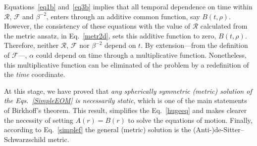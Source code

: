 Equations~\eqref{eq1b} and~\eqref{eq3b} implies that all temporal dependence on time within $\mathcal{R}$, $\mathcal{F}$ and $\beta^{-2}$, enters through an additive common function, say $B(t,\rho)$. However, the consistency of these equations with the value of $\mathcal{R}$ calculated from the metric ansatz, in Eq.~\eqref{metr2d}, sets this additive function to zero, $B(t,\rho)$. Therefore, neither $\mathcal{R}$, $\mathcal{F}$ nor $\beta^{-2}$ depend on $t$. By extension---from the definition of $\mathcal{F}$---, $\alpha$ could depend on time through a multiplicative function. Nonetheless, this multiplicative function can be eliminated of the problem by a redefinition of the \emph{time} coordinate.

At this stage, we have proved that \emph{any spherically symmetric (metric) solution of the Eqs.~\eqref{SimpleEOM} is necessarily static}, which is one of the main statements of Birkhoff's theorem. This result, simplifies the Eq.~\eqref{hugeeq} and makes clearer the necessity of setting $A(r) = B(r)$ to solve the equations of motion. Finally, according to Eq.~\eqref{simplef} the general (metric) solution is the (Anti-)de-Sitter--Schwarzschild metric.
